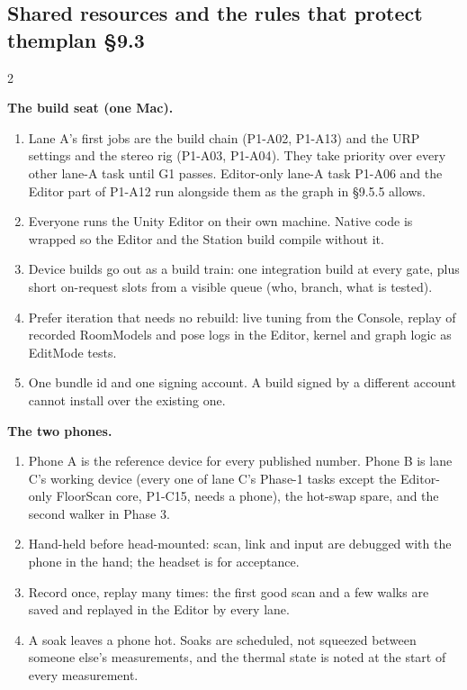 \documentclass[10pt,a4paper,landscape]{article}
\newcommand{\planmark}[1]{{\normalfont\fontsize{7.5}{9}\selectfont\color{muted}\if\relax\detokenize{#1}\relax\else plan #1\fi}}
\newcommand{\sub}[2]{\subsection[#1]{#1\hfill\planmark{#2}}}
\newcommand{\code}[1]{{\ttfamily #1}}
\newcommand{\minihead}[1]{\par\smallskip\textbf{#1}\par}
\begin{document}
\sub{Shared resources and the rules that protect them}{§9.3}
\begin{multicols}{2}
\minihead{The build seat (one Mac).}

\begin{enumerate}
  \item Lane A's first jobs are the build chain (\code{P1-\allowbreak{}A02}, \code{P1-\allowbreak{}A13}) and the URP settings and the stereo rig (\code{P1-\allowbreak{}A03}, \code{P1-\allowbreak{}A04}). They take priority over every other lane-A task until G1 passes. Editor-only lane-A task \code{P1-\allowbreak{}A06} and the Editor part of \code{P1-\allowbreak{}A12} run alongside them as the graph in §9.5.5 allows.
  \item Everyone runs the Unity Editor on their own machine. Native code is wrapped so the Editor and the Station build compile without it.
  \item Device builds go out as a build train: one integration build at every gate, plus short on-request slots from a visible queue (who, branch, what is tested).
  \item Prefer iteration that needs no rebuild: live tuning from the Console, replay of recorded RoomModels and pose logs in the Editor, kernel and graph logic as EditMode tests.
  \item One bundle id and one signing account. A build signed by a different account cannot install over the existing one.
\end{enumerate}

\minihead{The two phones.}

\begin{enumerate}
  \item Phone A is the reference device for every published number. Phone B is lane C's working device (every one of lane C's Phase-1 tasks except the Editor-only FloorScan core, \code{P1-\allowbreak{}C15}, needs a phone), the hot-swap spare, and the second walker in Phase 3.
  \item Hand-held before head-mounted: scan, link and input are debugged with the phone in the hand; the headset is for acceptance.
  \item Record once, replay many times: the first good scan and a few walks are saved and replayed in the Editor by every lane.
  \item A soak leaves a phone hot. Soaks are scheduled, not squeezed between someone else's measurements, and the thermal state is noted at the start of every measurement.
\end{enumerate}


\end{multicols}
\end{document}
